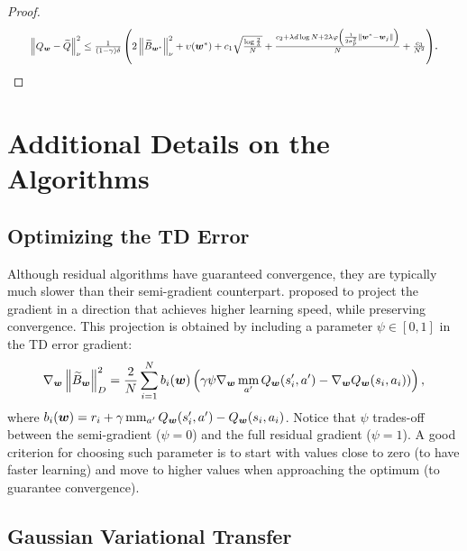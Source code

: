 \documentclass{article}
\newcommand{\mm}{\operatornamewithlimits{mm}}
\newcommand{\wt}[1]{\widetilde{#1}}
\newcommand{\norm}[1]{\left\lVert #1 \right\rVert}
\begin{document}
\begin{proof}
\begin{align*}
\resizebox{0.93\textwidth}{!}{$
\norm{Q_{\bm{w}} - \wt{Q}}_{\nu}^2 \leq \frac{1}{(1-\gamma)\delta}\left(2\norm{\wt{B}_{\bm{w}^{*}}}_{\nu}^2 + \upsilon(\bm{w}^*) + c_1\sqrt{\frac{\log\frac{2}{\delta}}{N}}  + \frac{c_2 + \lambda d \log N + 2\lambda\varphi\left(\frac{1}{2\sigma^2_p}\norm{\bm{w}^* - \bm{w}_j}\right)}{N} + \frac{c_3}{N^2}\right)$}.
\end{align*}
\end{proof}

\section{Additional Details on the Algorithms}

\subsection{Optimizing the TD Error}\label{app:b1}

Although residual algorithms have guaranteed convergence, they are typically much slower than their semi-gradient counterpart. \cite{baird1995residual} proposed to project the gradient in a direction that achieves higher learning speed, while preserving convergence. This projection is obtained by including a parameter $\psi\in[0,1]$ in the TD error gradient:
\begin{equation}
\nabla_{\bm{w}}\norm{\wt{B}_{\bm{w}}}_{D}^2 = \frac{2}{N}\sum_{i=1}^N b_i(\bm{w})\left( \gamma\psi\nabla_{\bm{w}}\mm_{a'}Q_{\bm{w}}(s_i',a') - \nabla_{\bm{w}}Q_{\bm{w}}(s_i,a_i)) \right),
\end{equation}
where $b_i(\bm{w}) = r_i + \gamma\mm_{a'}Q_{\bm{w}}(s_i',a') - Q_{\bm{w}}(s_i,a_i)$. Notice that $\psi$ trades-off between the semi-gradient ($\psi = 0$) and the full residual gradient ($\psi = 1$). A good criterion for choosing such parameter is to start with values close to zero (to have faster learning) and move to higher values when approaching the optimum (to guarantee convergence).

\subsection{Gaussian Variational Transfer}\label{app:b2}
\end{document}
